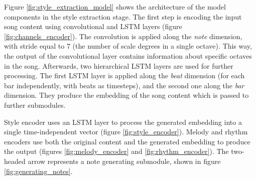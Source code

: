 \documentclass[en]{pracamgr}
\begin{document}
Figure \ref{fig:style_extraction_model} shows the architecture of the model components in the style extraction stage.
The first step is encoding the input song content using convolutional and LSTM layers (figure \ref{fig:channels_encoder}).
The convolution is applied along the \emph{note} dimension, with stride equal to 7 (the number of scale degrees in a single octave).
This way, the output of the convolutional layer contains information about specific octaves in the song.
Afterwards, two hierarchical LSTM layers are used for further processing.
The first LSTM layer is applied along the \emph{beat} dimension (for each bar independently, with beats as timesteps), and the second one along the \emph{bar} dimension.
They produce the embedding of the song content which is passed to further submodules.

Style encoder uses an LSTM layer to process the generated embedding into a single time-independent vector (figure \ref{fig:style_encoder}).
Melody and rhythm encoders use both the original content and the generated embedding to produce the output (figures \ref{fig:melody_encoder} and \ref{fig:rhythm_encoder}).
The two-headed arrow represents a note generating submodule, shown in figure \ref{fig:generating_notes}.
\end{document}
